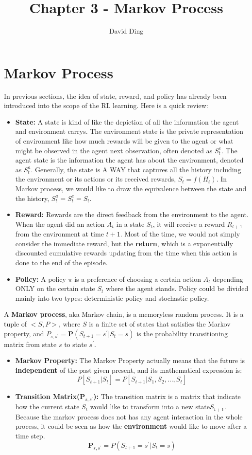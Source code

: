 \documentclass{article}
\title{Chapter 3 - Markov Process}
\author{David Ding}
\begin{document}
\maketitle

\section{Markov Process}
In previous sections, the idea of state, reward, and policy has already been introduced into the scope of the RL learning. Here is a quick review:
\begin{itemize}
    \item \textbf{State:} A state is kind of like the depiction of all the information the agent and environment carrys. The environment state is the private 
    representation of environment like how much rewards will be given to the agent or what might be observed in the agent next observation, often denoted as $S_t^e$.
    The agent state is the information the agent has about the environment, denoted as $S_t^a$. Generally, the state is A WAY that captures all the history including the environment
    or its actions or its received rewards, $S_t = f(H_t)$. In Markov process, we would like to draw the equivalence between the state and the history, $S_t^a = S_t^e = S_t$.
    \item \textbf{Reward:} Rewards are the direct feedback from the environment to the agent. When the agent did an action $A_t$ in a state $S_t$, it will receive a reward
    $R_{t+1}$ from the environment at time $t+1$. Most of the time, we would not simply consider the immediate reward, but the \textbf{return}, which is a exponentially discounted cumulative
    rewards updating from the time when this action is done to the end of the episode. 
    \item \textbf{Policy:} A policy $\pi$ is a preference of choosing a certain action $A_t$ depending ONLY on the certain state $S_t$ where the agent stands.
    Policy could be divided mainly into two types: deterministic policy and stochastic policy. 
\end{itemize}
\vspace{3em}
A \textbf{Markov process}, aka Markov chain, is a memoryless random process. It is a tuple of $<S, P>$, where $S$ is a finite set of states that satisfies the Markov property, 
and $P_{s, s^{'}} = \mathbf{P}(S_{t+1} = s^{'}|S_t = s)$ is the probability transitioning matrix from state $s$ to state $s^{'}$. 
\begin{itemize}
    \item \textbf{Markov Property:} The Markov Property actually means that the future is \textbf{independent} of 
    the past given present, and its mathematical expression is: $$P[S_{t+1}|S_t] = P[S_{t+1}|S_1, S_2, ..., S_t]$$
    \item \textbf{Transition Matrix($\mathbf{P}_{s, s^{'}}$):} The transition matrix is a matrix that indicate how the current state $S_t$ 
    would like to transform into a new state$S_{t+1}$. Because the markov process does not has any agent interaction in the whole
    process, it could be seen as how the \textbf{environment} would like to move after a time step.
    $$\mathbf{P}_{s, s^{'}} = P(S_{t+1} = s^{'}|S_t = s)$$
\end{itemize}
\end{document}
